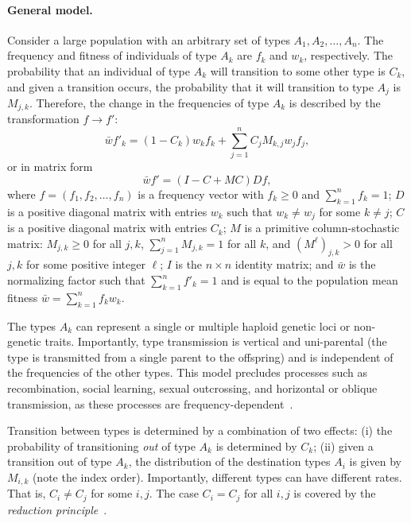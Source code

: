 \documentclass[9pt, a4paper, twocolumn]{extarticle}
\newcommand{\ci}{I}
\begin{document}
\paragraph*{General model.}\label{sec:general_model}
Consider a large  population with an arbitrary set of types $A_1, A_2, \ldots, A_n$.
The frequency and fitness of individuals of type $A_k$ are $f_k$ and $w_k$, respectively.
The probability that an individual of type $A_k$ will transition to some other type is $C_k$, and given a transition occurs, the probability that it will transition to type $A_j$ is $M_{j,k}$.
Therefore, the change in the frequencies of type $A_k$ is described by the transformation $f \to f'$: 
\begin{equation}
\bar{w} f'_k = (1-C_k) w_k f_k + \sum_{j=1}^{n}{C_j M_{k,j} w_j f_j},
\label{eq:model_sum}
\end{equation}
or in matrix form
\begin{equation}
\bar{w} f' = (\ci - C + MC)D f,
\label{eq:model}
\end{equation}
where $f=(f_1, f_2, \ldots, f_n)$ is a frequency vector with $f_k\ge 0$ and  $\sum_{k=1}^n{f_k} = 1$;
$D$ is a positive diagonal matrix with entries $w_k$ such that $w_k \ne w_j$ for some $k \ne j$; 
$C$ is a positive diagonal  matrix with entries $C_k$;
$M$ is a primitive column-stochastic matrix: $M_{j,k} \ge 0$ for all $j,k$, $\sum_{j=1}^n {M_{j,k}} = 1$ for all $k$, and $(M^{\ell})_{j,k} > 0$ for all $j,k$ for some positive integer $\ell$;
$\ci$ is the $n\times n$ identity matrix;
and $\bar{w}$ is the normalizing factor such that $\sum_{k=1}^n{f'_k}=1$ and is equal to the population mean fitness $\bar w=\sum_{k=1}^n f_kw_k$.

The types $A_k$ can represent a single or multiple haploid genetic loci or non-genetic traits.
Importantly, type transmission is vertical and uni-parental (the type is transmitted from a single parent to the offspring) and is independent of the frequencies of the other types.
This model precludes processes such as recombination, social learning, sexual outcrossing, and horizontal or oblique transmission, as these processes are frequency-dependent~\citep[pg.~54]{Cavalli-Sforza1981}.

Transition between types is determined by a combination of two effects:
(i) the probability of transitioning \emph{out} of type $A_k$ is determined by $C_k$;
(ii) given a transition out of type $A_k$, the distribution of the destination types $A_i$ is given by $M_{i,k}$ (note the index order).
Importantly, different types can have different rates.
That is, $C_i \ne C_j$ for some $i,j$. The case $C_i = C_j$ for all $i,j$ is covered by the \emph{reduction principle}~\citep[see][]{Altenberg2017}.
\end{document}
